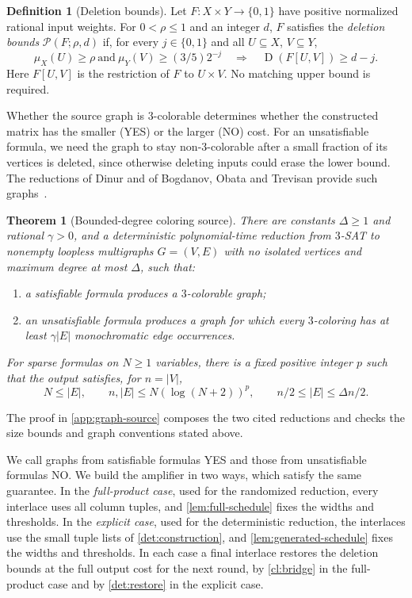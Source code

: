 \documentclass[11pt,letterpaper]{article} \usepackage[utf8]{inputenc}
\theoremstyle{plain} \newtheorem{theorem}{Theorem}[section]
\theoremstyle{definition} \newaliascnt{definition}{theorem}
\newtheorem{definition}[definition]{Definition} \aliascntresetthe{definition}
\newcommand{\D}{\operatorname{D}}
\newcommand{\RP}[3]{\mathcal{P}(#1;#2,#3)}
\begin{document}
\begin{definition}[Deletion bounds]
\label{def:profile}
Let \(F:X\times Y\to\{0,1\}\) have positive normalized rational input weights. For
\(0<\rho\le1\) and an integer \(d\), \(F\) satisfies the
\emph{deletion bounds} \(\RP{F}{\rho}{d}\) if, for every \(j\in\{0,1\}\) and all \(U\subseteq X\), \(V\subseteq
Y\),
\[
\mu_X(U)\ge\rho\ \text{and}\ \mu_Y(V)\ge(3/5)2^{-j} \quad\Longrightarrow\quad
\D(F[U,V])\ge d-j.
\]
Here \(F[U,V]\) is the restriction of \(F\) to \(U\times V\).
No matching upper bound is required.
\end{definition}

Whether the source graph is $3$-colorable determines whether the constructed
matrix has the smaller (YES) or the larger (NO) cost. For an unsatisfiable formula, we need the graph
to stay non-$3$-colorable after a small fraction of its vertices is deleted,
since otherwise deleting inputs could erase the lower bound. The reductions
of Dinur and of Bogdanov, Obata and Trevisan provide such
graphs~\cite{dinur2007pcp,bogdanov2002lower}.

\begin{theorem}[Bounded-degree coloring source]
\label{src:gap-colouring}
There are constants \(\Delta\ge1\) and rational \(\gamma>0\), and a
deterministic polynomial-time reduction from \(3\)-SAT to nonempty
loopless multigraphs \(G=(V,E)\) with no isolated vertices and maximum degree at
most \(\Delta\), such that:
\begin{enumerate}
\item a satisfiable formula produces a $3$-colorable graph;
\item an unsatisfiable formula produces a graph for which every $3$-coloring has at least \(\gamma|E|\) monochromatic edge occurrences.
\end{enumerate}
For sparse formulas on \(N\ge1\) variables, there is a fixed positive integer
\(p\) such that the output satisfies, for \(n=|V|\),
\[
N\le |E|,\qquad n,|E|\le N(\log(N+2))^p,\qquad n/2\le |E|\le\Delta n/2.
\]
\end{theorem}

The proof in \cref{app:graph-source} composes the two cited reductions and
checks the size bounds and graph conventions stated above.

We call graphs from satisfiable formulas YES and those from unsatisfiable
formulas NO. We build the amplifier in two ways, which satisfy the same
guarantee. In the \emph{full-product case}, used for the randomized
reduction, every interlace uses all column tuples, and
\cref{lem:full-schedule} fixes the widths and thresholds. In the \emph{explicit case},
used for the deterministic reduction, the interlaces use the small tuple lists of
\cref{det:construction}, and \cref{lem:generated-schedule} fixes the
widths and thresholds. In each case a final interlace restores the deletion
bounds at the full output cost for the next round, by \cref{cl:bridge} in the full-product case and by
\cref{det:restore} in the explicit case.
\end{document}
